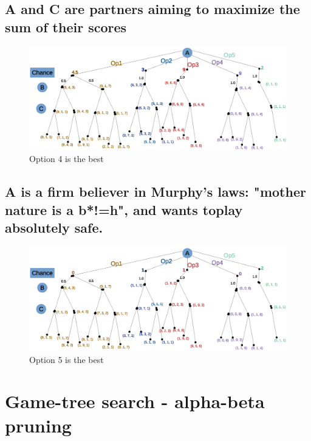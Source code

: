 \documentclass{article}                     %
\begin{document}
	\subsection{A and C are partners aiming to maximize the sum of their scores}
	\begin{figure}[H]
		\centering
		\includegraphics[width=0.7\linewidth]{q3_4.eps}
		\caption{Option 4 is the best}
		\label{fig:q31}
	\end{figure}

	\subsection{A is a firm believer in Murphy's laws: "mother nature is a b*!=h", and wants toplay absolutely safe.}
	\begin{figure}[H]
		\centering
		\includegraphics[width=0.7\linewidth]{q3_5.eps}
		\caption{Option 5 is the best}
		\label{fig:q31}
	\end{figure}

	
	\section{Game-tree search - alpha-beta pruning}
\end{document}
